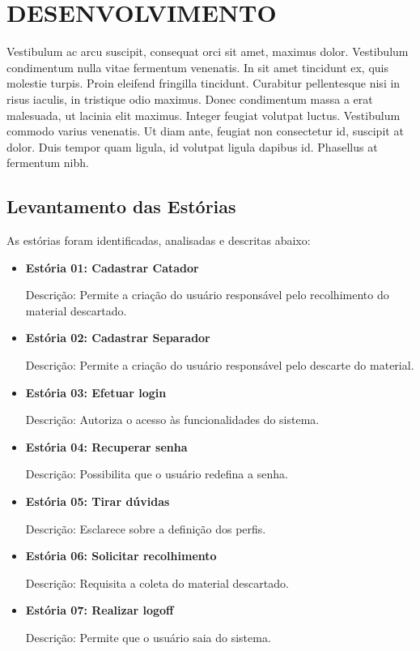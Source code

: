 \chapter{DESENVOLVIMENTO}
\label{cap:desenvolvimento}
Vestibulum ac arcu suscipit, consequat orci sit amet, maximus dolor. Vestibulum condimentum
nulla vitae fermentum venenatis. In sit amet tincidunt ex, quis molestie turpis. Proin eleifend
fringilla tincidunt. Curabitur pellentesque nisi in risus iaculis, in tristique odio maximus.
Donec condimentum massa a erat malesuada, ut lacinia elit maximus. Integer feugiat volutpat
luctus. Vestibulum commodo varius venenatis. Ut diam ante, feugiat non consectetur id, suscipit
at dolor. Duis tempor quam ligula, id volutpat ligula dapibus id. Phasellus at fermentum nibh.

\section{Levantamento das Estórias}

As estórias foram identificadas, analisadas e descritas abaixo:

\begin{itemize}
	\item \textbf{Estória 01: Cadastrar Catador}\par
Descrição: Permite a criação do usuário responsável pelo recolhimento do material descartado.

	\item \textbf{Estória 02: Cadastrar Separador}\par
Descrição: Permite a criação do usuário responsável pelo descarte do material.

	\item \textbf{Estória 03: Efetuar login}\par
Descrição: Autoriza o acesso às funcionalidades do sistema. 

	\item \textbf{Estória 04: Recuperar senha }\par
Descrição: Possibilita que o usuário redefina a senha.

	\item \textbf{Estória 05: Tirar dúvidas }\par
Descrição: Esclarece sobre a definição dos perfis. 

	\item \textbf{Estória 06: Solicitar recolhimento}\par
Descrição: Requisita a coleta do material descartado.

	\item \textbf{Estória 07: Realizar logoff}\par
Descrição: Permite que o usuário saia do sistema.

\end{itemize}


